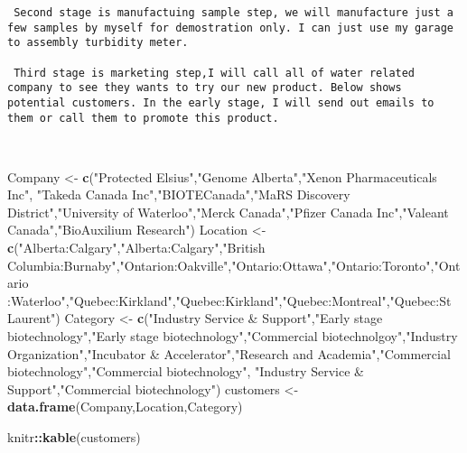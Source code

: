 \documentclass[]{article}
\newenvironment{Shaded}{\begin{snugshade}}{\end{snugshade}}
\newcommand{\KeywordTok}[1]{\textcolor[rgb]{0.13,0.29,0.53}{\textbf{#1}}}
\newcommand{\StringTok}[1]{\textcolor[rgb]{0.31,0.60,0.02}{#1}}
\newcommand{\OperatorTok}[1]{\textcolor[rgb]{0.81,0.36,0.00}{\textbf{#1}}}
\newcommand{\NormalTok}[1]{#1}
\begin{document}
\begin{verbatim}
 Second stage is manufactuing sample step, we will manufacture just a few samples by myself for demostration only. I can just use my garage to assembly turbidity meter.  

 Third stage is marketing step,I will call all of water related company to see they wants to try our new product. Below shows potential customers. In the early stage, I will send out emails to them or call them to promote this product. 
 
 
\end{verbatim}

\begin{Shaded}
\begin{Highlighting}[]
\NormalTok{Company  <-}\StringTok{ }\KeywordTok{c}\NormalTok{(}\StringTok{"Protected Elsius"}\NormalTok{,}\StringTok{"Genome Alberta"}\NormalTok{,}\StringTok{"Xenon Pharmaceuticals Inc"}\NormalTok{, }\StringTok{"Takeda Canada Inc"}\NormalTok{,}\StringTok{"BIOTECanada"}\NormalTok{,}\StringTok{"MaRS Discovery District"}\NormalTok{,}\StringTok{"University of Waterloo"}\NormalTok{,}\StringTok{"Merck Canada"}\NormalTok{,}\StringTok{"Pfizer Canada Inc"}\NormalTok{,}\StringTok{"Valeant Canada"}\NormalTok{,}\StringTok{"BioAuxilium Research"}\NormalTok{)}
\NormalTok{Location <-}\StringTok{ }\KeywordTok{c}\NormalTok{(}\StringTok{"Alberta:Calgary"}\NormalTok{,}\StringTok{"Alberta:Calgary"}\NormalTok{,}\StringTok{"British Columbia:Burnaby"}\NormalTok{,}\StringTok{"Ontarion:Oakville"}\NormalTok{,}\StringTok{"Ontario:Ottawa"}\NormalTok{,}\StringTok{"Ontario:Toronto"}\NormalTok{,}\StringTok{"Ontario :Waterloo"}\NormalTok{,}\StringTok{"Quebec:Kirkland"}\NormalTok{,}\StringTok{"Quebec:Kirkland"}\NormalTok{,}\StringTok{"Quebec:Montreal"}\NormalTok{,}\StringTok{"Quebec:St Laurent"}\NormalTok{)}
\NormalTok{Category <-}\StringTok{ }\KeywordTok{c}\NormalTok{(}\StringTok{"Industry Service & Support"}\NormalTok{,}\StringTok{"Early stage biotechnology"}\NormalTok{,}\StringTok{"Early stage biotechnology"}\NormalTok{,}\StringTok{"Commercial biotechnolgoy"}\NormalTok{,}\StringTok{"Industry Organization"}\NormalTok{,}\StringTok{"Incubator & Accelerator"}\NormalTok{,}\StringTok{"Research and Academia"}\NormalTok{,}\StringTok{"Commercial biotechnology"}\NormalTok{,}\StringTok{"Commercial biotechnology"}\NormalTok{, }\StringTok{"Industry Service & Support"}\NormalTok{,}\StringTok{"Commercial biotechnology"}\NormalTok{)}
\NormalTok{customers <-}\StringTok{ }\KeywordTok{data.frame}\NormalTok{(Company,Location,Category)}

\NormalTok{knitr}\OperatorTok{::}\KeywordTok{kable}\NormalTok{(customers)}
\end{Highlighting}
\end{Shaded}
\end{document}
